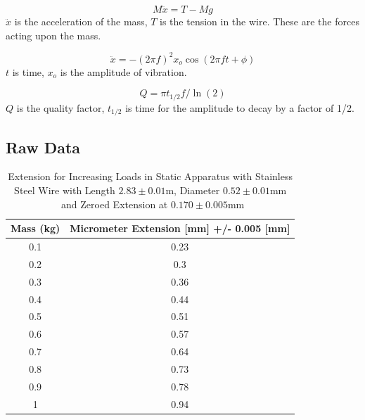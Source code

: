 \documentclass[]{article}
\newcommand{\staticWireDiameter}{\ensuremath{0.52 \pm 0.01 \si{\milli\meter}}}
\newcommand{\staticWireLength}{\ensuremath{2.83 \pm 0.01 \si{\meter}}}
\newcommand{\zero}{\ensuremath{0.170 \pm 0.005 \si{\milli\meter}}}
\begin{document}
\begin{equation}\label{eq:Tension}
    M\ddot{x} = T - Mg
\end{equation}
$\ddot{x}$ is the acceleration of the mass, $T$ is the tension in the wire. These
are the forces acting upon the mass.

\begin{equation}\label{eq:oscillation}
    \ddot{x} = -{(2\pi f)}^2 x_o \cos(2\pi ft + \phi)
\end{equation}
$t$ is time, $x_o$ is the amplitude of vibration.

\begin{equation}\label{eq:Q}
    Q = \pi t_{1/2}f/\ln(2)
\end{equation}
$Q$ is the quality factor, $t_{1/2}$ is time for the amplitude to decay by a
factor of 1/2.

\subsection{Raw Data}

\begin{table}[H]
    \centering
    \caption{Extension for Increasing Loads in Static Apparatus with Stainless
    Steel Wire with Length \staticWireLength, Diameter \staticWireDiameter~and
    Zeroed Extension at \zero}\label{tab:increasing}
    \begin{tabular}{@{}cc@{}}
        \toprule
        Mass (kg) & Micrometer Extension {[}mm{]} +/- 0.005 [mm] \\ \midrule
        0.1       & 0.23                                    \\
        0.2       & 0.3                                     \\
        0.3       & 0.36                                    \\
        0.4       & 0.44                                    \\
        0.5       & 0.51                                    \\
        0.6       & 0.57                                    \\
        0.7       & 0.64                                    \\
        0.8       & 0.73                                    \\
        0.9       & 0.78                                    \\
        1         & 0.94                                    \\ \bottomrule
    \end{tabular}
\end{table}
\end{document}
